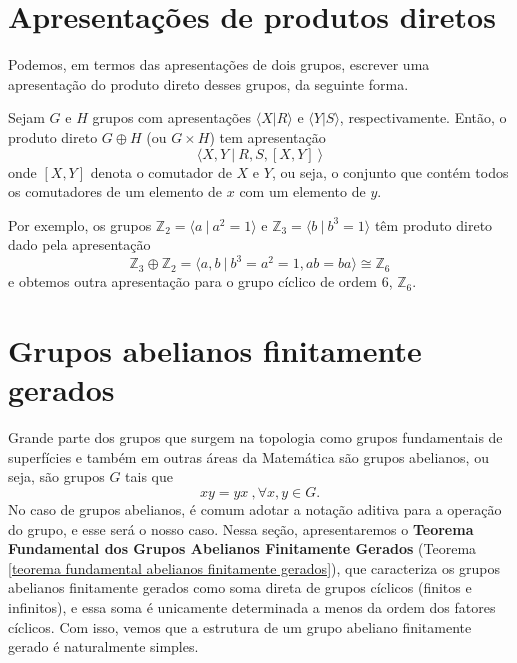 	\section{Apresentações de produtos diretos}
	    Podemos, em termos das apresentações de dois grupos, escrever uma apresentação do produto direto 
	    desses grupos, da seguinte forma.
    	\begin{prop}
    	\label{apresentacao prod direto}
        	Sejam $G$ e $H$ grupos com apresentações $\langle X|R \rangle$ e $\langle Y|S \rangle$,
        	respectivamente. Então, o produto direto $G\oplus H$ (ou $G\times H$) tem apresentação
        	\begin{equation*}
        	    \langle X,Y \ | \ R,S, [X,Y] \ \rangle
        	\end{equation*}
        	onde $[X,Y]$ denota o comutador de $X$ e $Y$, ou seja, o conjunto que contém todos os 
        	comutadores de um elemento de $x$ com um elemento de $y$.
    	\end{prop}
    	Por exemplo, os grupos $\mathbb{Z}_2 = \langle a \ | \ a^2=1 \rangle$ e 
    	$\mathbb{Z}_3 = \langle b\ | \ b^3=1 \rangle$ têm produto direto dado pela apresentação
    	\begin{equation*}
    	    \mathbb{Z}_3\oplus\mathbb{Z}_2 = \langle a,b \ | \ b^3=a^2=1, ab = ba \rangle \cong \mathbb{Z}_6 
    	\end{equation*}
    	e obtemos outra apresentação para o grupo cíclico de ordem $6$, $\mathbb{Z}_6$.
	\section{Grupos abelianos finitamente gerados}
    	Grande parte dos grupos que surgem na topologia como grupos fundamentais de superfícies e também 
    	em outras áreas da Matemática são grupos abelianos, ou seja, são grupos $G$ tais que
    	\begin{equation*}
    	    xy = yx\ , \forall x,y\in G.
    	\end{equation*}
    	No caso de grupos abelianos, é comum adotar a notação aditiva para a operação 
    	do grupo, e esse será o nosso caso. 
    	Nessa seção, apresentaremos o \textbf{Teorema Fundamental dos Grupos Abelianos Finitamente
    	Gerados} (Teorema \ref{teorema fundamental abelianos finitamente gerados}), 
    	que caracteriza os grupos abelianos finitamente gerados como soma direta de grupos cíclicos
    	(finitos e infinitos), e essa soma é unicamente determinada a menos da ordem dos fatores cíclicos. 
    	Com isso, vemos que a estrutura de um grupo abeliano finitamente gerado é naturalmente simples.
    	
